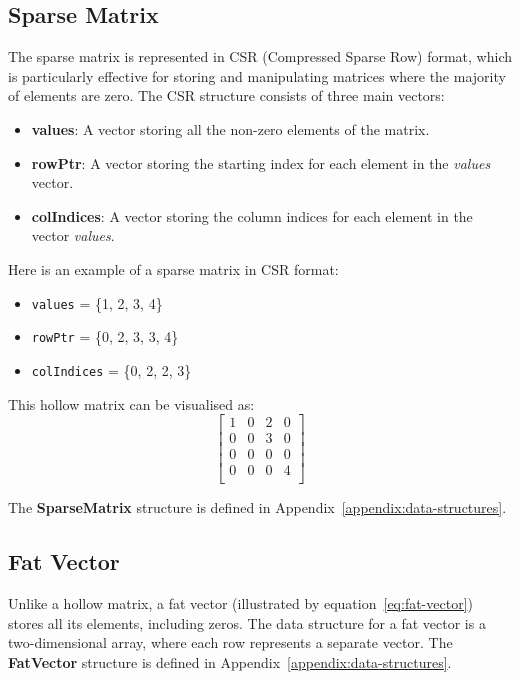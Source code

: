 \documentclass[12pt,oneside]{book} %
\begin{document}
\subsection{Sparse Matrix}
The sparse matrix is represented in CSR (Compressed Sparse Row) format, which
is particularly effective for storing and manipulating matrices where the
majority of elements are zero. The CSR structure consists of three main
vectors:
\begin{itemize}
    \item \textbf{values}: A vector storing all the non-zero elements of the matrix.
    \item \textbf{rowPtr}: A vector storing the starting index for each element in the
          \textit{values} vector.
    \item \textbf{colIndices}: A vector storing the column indices for each element in the vector \textit{values}.
          \
\end{itemize}

Here is an example of a sparse matrix in CSR format:
\begin{itemize}
    \item \texttt{values} = \{1, 2, 3, 4\}
    \item \texttt{rowPtr} = \{0, 2, 3, 3, 4\}
    \item \texttt{colIndices} = \{0, 2, 2, 3\}
\end{itemize}

This hollow matrix can be visualised as:
\[
    \begin{bmatrix}
        1 & 0 & 2 & 0 \\
        0 & 0 & 3 & 0 \\
        0 & 0 & 0 & 0 \\
        0 & 0 & 0 & 4 \\
    \end{bmatrix}
\]

The \textbf{SparseMatrix} structure is defined in
Appendix~\ref{appendix:data-structures}.

\subsection{Fat Vector}
Unlike a hollow matrix, a fat vector (illustrated by
equation~\ref{eq:fat-vector}) stores all its elements, including zeros. The
data structure for a fat vector is a two-dimensional array, where each row
represents a separate vector. The \textbf{FatVector} structure is defined in
Appendix~\ref{appendix:data-structures}.
\end{document}
